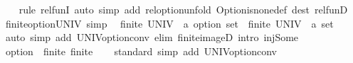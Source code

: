 \begin{isabellebody}
%
\isadelimproof
\ \ %
\endisadelimproof
%
\isatagproof
{}\isamarkupfalse%
\ {\isacharparenleft}{\kern0pt}rule\ rel{\isacharunderscore}{\kern0pt}funI{\isacharparenright}{\kern0pt}{\isacharplus}{\kern0pt}\ {\isacharparenleft}{\kern0pt}auto\ simp\ add{\isacharcolon}{\kern0pt}\ rel{\isacharunderscore}{\kern0pt}option{\isacharunderscore}{\kern0pt}unfold\ Option{\isachardot}{\kern0pt}is{\isacharunderscore}{\kern0pt}none{\isacharunderscore}{\kern0pt}def\ dest{\isacharcolon}{\kern0pt}\ rel{\isacharunderscore}{\kern0pt}funD{\isacharparenright}{\kern0pt}%
\endisatagproof
{\isafoldproof}%
%
\isadelimproof
\isanewline
%
\endisadelimproof
\isanewline
{}\isamarkupfalse%
%
\isadelimdocument
%
\endisadelimdocument
%
\isatagdocument
%
\isamarkuptrue%
%
\endisatagdocument
{\isafolddocument}%
%
\isadelimdocument
%
\endisadelimdocument
{}\isamarkupfalse%
\ finite{\isacharunderscore}{\kern0pt}option{\isacharunderscore}{\kern0pt}UNIV\ {\isacharbrackleft}{\kern0pt}simp{\isacharbrackright}{\kern0pt}{\isacharcolon}{\kern0pt}\isanewline
\ \ {\isachardoublequoteopen}finite\ {\isacharparenleft}{\kern0pt}UNIV\ {\isacharcolon}{\kern0pt}{\isacharcolon}{\kern0pt}\ {\isacharprime}{\kern0pt}a\ option\ set{\isacharparenright}{\kern0pt}\ {\isacharequal}{\kern0pt}\ finite\ {\isacharparenleft}{\kern0pt}UNIV\ {\isacharcolon}{\kern0pt}{\isacharcolon}{\kern0pt}\ {\isacharprime}{\kern0pt}a\ set{\isacharparenright}{\kern0pt}{\isachardoublequoteclose}\isanewline
%
\isadelimproof
\ \ %
\endisadelimproof
%
\isatagproof
{}\isamarkupfalse%
\ {\isacharparenleft}{\kern0pt}auto\ simp\ add{\isacharcolon}{\kern0pt}\ UNIV{\isacharunderscore}{\kern0pt}option{\isacharunderscore}{\kern0pt}conv\ elim{\isacharcolon}{\kern0pt}\ finite{\isacharunderscore}{\kern0pt}imageD\ intro{\isacharcolon}{\kern0pt}\ inj{\isacharunderscore}{\kern0pt}Some{\isacharparenright}{\kern0pt}%
\endisatagproof
{\isafoldproof}%
%
\isadelimproof
\isanewline
%
\endisadelimproof
\isanewline
{}\isamarkupfalse%
\ option\ {\isacharcolon}{\kern0pt}{\isacharcolon}{\kern0pt}\ {\isacharparenleft}{\kern0pt}finite{\isacharparenright}{\kern0pt}\ finite\isanewline
%
\isadelimproof
\ \ %
\endisadelimproof
%
\isatagproof
{}\isamarkupfalse%
\ standard\ {\isacharparenleft}{\kern0pt}simp\ add{\isacharcolon}{\kern0pt}\ UNIV{\isacharunderscore}{\kern0pt}option{\isacharunderscore}{\kern0pt}conv{\isacharparenright}{\kern0pt}%
\endisatagproof
{\isafoldproof}%
%
\isadelimproof
%
\endisadelimproof
%
\isadelimdocument
%
\endisadelimdocument

\end{isabellebody}
